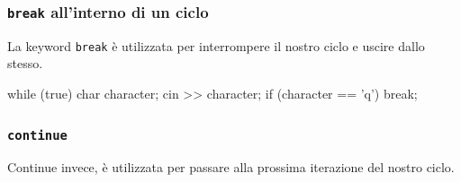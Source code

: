 \documentclass{beamer}
\begin{document}
    \begin{frame}[fragile]
        \frametitle{\texttt{break} all'interno di un ciclo}
        La keyword \texttt{break} è utilizzata per interrompere il nostro ciclo e uscire dallo stesso.
        \begin{cppcode}
            while (true) {
                char character;
                cin >> character;
                if (character == 'q') {
                    break;
                }
            }
        \end{cppcode}
    \end{frame}

    \begin{frame}[fragile]
        \frametitle{\texttt{continue}}
        Continue invece, è utilizzata per passare alla prossima iterazione del nostro ciclo.
    \end{frame}
\end{document}
